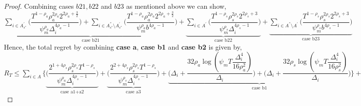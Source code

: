 \begin{proof}
Combining cases $b21,b22$ and $b23$ as mentioned above we can show,
\newline
$\underbrace{\sum_{i\in A^{'}_{s^{*}}}\bigg(\dfrac{T^{1-\rho_{a}}\rho_{a}^{2\rho_{a}}2^{2\rho_{a}+\frac{3}{2}}}{\psi_{m}^{\rho_{a}}\Delta_{i}^{4\rho_{a} -1}} \bigg)+\sum_{i\in A^{''}_{s^{*}}\setminus A^{'}_{s^{*}}}\bigg(\dfrac{T^{1-\rho_{a}}\rho_{a}^{2\rho_{a}}2^{2\rho_{a}+\frac{3}{2}}}{\psi_{m}^{\rho_{a}}b^{4\rho_{a} -1}} \bigg)}_{\text{case b21}} + \underbrace{\sum_{i\in A^{'}}\bigg(\dfrac{T^{1-\rho_{s}}\rho_{s}^{2\rho_{s}}2^{2\rho_{s}+3}}{\psi_{m}^{\rho_{s}}\Delta_{i}^{4\rho_{s}-1}} \bigg)}_{\text{case b22}}+\underbrace{\sum_{i\in A^{''}\setminus A^{'}}\bigg(\dfrac{T^{1-\rho_{s}}\rho_{s}^{2\rho_{s}}2^{2\rho_{s}+3}}{\psi_{m}^{\rho_{s}}b^{4\rho_{s} -1}} \bigg)}_{\text{case b23}}$
\newline
Hence, the total regret by combining \textbf{case a}, \textbf{case b1} and \textbf{case b2} is given by,
\newline
$R_{T}\leq \sum_{i\in A} \bigg\lbrace  \underbrace{\bigg(\dfrac{2^{1+4\rho_{s}}\rho_{s}^{2\rho_{s}}T^{1-\rho_{s}}}{\psi_{m}^{\rho_{a}}\Delta_{i}^{4\rho_{s}-1}}\bigg)}_{\text{case a1+a2}} + \underbrace{  \bigg(\dfrac{2^{2+4\rho_{s}}\rho_{s}^{2\rho_{s}}T^{1-\rho_{s}}}{\psi_{m}^{\rho_{s}}\Delta_{i}^{4\rho_{s}-1}}\bigg)}_{\text{case a3}} + \underbrace{\bigg(\Delta_{i}+\dfrac{32\rho_{a}\log{(\psi_{m}T\dfrac{\Delta_{i}^{4}}{16\rho_{a}^{2}})}}{\Delta_{i}}\bigg) + \bigg(\Delta_{i}+\dfrac{32\rho_{s}\log{(\psi_{m}T\dfrac{\Delta_{i}^{4}}{16\rho_{s}^{2}})}}{\Delta_{i}}\bigg)}_{\text{case b1}}\bigg\rbrace + \underbrace{\sum_{i\in A_{s^{*}}}\bigg\lbrace \bigg(\dfrac{T^{1-\rho_{a}}\rho_{a}^{2\rho_{a}}2^{2\rho_{a}+\frac{3}{2}}}{\psi_{m}^{\rho_{a}}\Delta_{i}^{4\rho_{a} -1}} \bigg) + \bigg(\dfrac{T^{1-\rho_{a}}\rho_{a}^{2\rho_{a}}2^{2\rho_{a}+\frac{3}{2}}}{\psi_{m}^{\rho_{a}}\Delta_{i}^{4\rho_{a} -1}} \bigg)\bigg\rbrace + \sum_{i\in A}\bigg\lbrace \bigg(\dfrac{T^{1-\rho_{s}}\rho_{s}^{2\rho_{s}}2^{2\rho_{s}+3}}{\psi_{m}^{\rho_{s}}\Delta_{i}^{4\rho_{s}-1}} \bigg)+\bigg(\dfrac{T^{1-\rho_{s}}\rho_{s}^{2\rho_{s}}2^{2\rho_{s}+3}}{\psi_{m}^{\rho_{s}}b^{4\rho_{s} -1}} \bigg)}_{\text{case b2}} \bigg\rbrace + max_{i:\Delta_{i}\leq b}\Delta_{i}T $

\end{proof}
